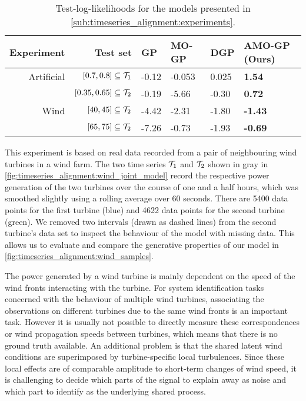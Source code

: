 \begin{table}[tp]
    \centering
    \caption{
        \label{tab:timeseries_alignment:dampened_sine_model_log_likelihoods}
        Test-log-likelihoods for the models presented in \cref{sub:timeseries_alignment:experiments}.
    }
    \begin{tabularx}{\linewidth}{rrYYYY}
        \toprule
        Experiment & Test set & GP & MO-GP & DGP & AMO-GP (Ours) \\
        \midrule
        Artificial & $[0.7, 0.8] \subseteq \mathcal{T}_1$ & -0.12 & -0.053 & 0.025 & \textbf{1.54} \\
        & $[0.35, 0.65] \subseteq \mathcal{T}_2$ & -0.19 & -5.66 & -0.30 & \textbf{0.72} \\
        \midrule
        Wind & $[40, 45] \subseteq \mathcal{T}_2 $ & -4.42 & -2.31 & -1.80 & \textbf{-1.43} \\
        & $[65, 75] \subseteq \mathcal{T}_2 $ & -7.26 & -0.73 & -1.93 & \textbf{-0.69} \\
        \bottomrule
    \end{tabularx}
\end{table}
This experiment is based on real data recorded from a pair of neighbouring wind turbines in a wind farm.
The two time series $\mathcal{T}_1$ and $\mathcal{T}_2$ shown in gray in \cref{fig:timeseries_alignment:wind_joint_model} record the respective power generation of the two turbines over the course of one and a half hours, which was smoothed slightly using a rolling average over 60 seconds.
There are 5400 data points for the first turbine (blue) and 4622 data points for the second turbine (green).
We removed two intervals (drawn as dashed lines) from the second turbine's data set to inspect the behaviour of the model with missing data.
This allows us to evaluate and compare the generative properties of our model in \cref{fig:timeseries_alignment:wind_samples}.

The power generated by a wind turbine is mainly dependent on the speed of the wind fronts interacting with the turbine.
For system identification tasks concerned with the behaviour of multiple wind turbines, associating the observations on different turbines due to the same wind fronts is an important task.
However it is usually not possible to directly measure these correspondences or wind propagation speeds between turbines, which means that there is no ground truth available.
An additional problem is that the shared latent wind conditions are superimposed by turbine-specific local turbulences.
Since these local effects are of comparable amplitude to short-term changes of wind speed, it is challenging to decide which parts of the signal to explain away as noise and which part to identify as the underlying shared process.

